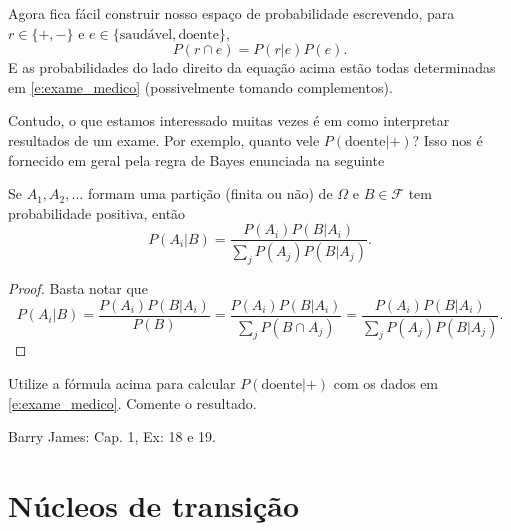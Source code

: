 Agora fica fácil construir nosso espaço de probabilidade escrevendo, para $r \in \{+, -\}$ e $e \in \{\text{saudável}, \text{doente}\}$,
\begin{equation}
  P(r \cap e) = P(r | e) P(e).
\end{equation}
E as probabilidades do lado direito da equação acima estão todas determinadas em \eqref{e:exame_medico} (possivelmente tomando complementos).

Contudo, o que estamos interessado muitas vezes é em como interpretar resultados de um exame.
Por exemplo, quanto vele $P(\text{doente} | +)$?
Isso nos é fornecido em geral pela regra de Bayes enunciada na seguinte

\begin{proposition}
  Se $A_1, A_2, \dots$ formam uma partição (finita ou não) de $\Omega$ e $B \in \mathcal{F}$ tem probabilidade positiva, então
  \begin{equation}
    P(A_i | B) = \frac{P(A_i) P(B | A_i)}{\sum_j P(A_j) P(B | A_j)}.
  \end{equation}
\end{proposition}

\begin{proof}
  Basta notar que
  \begin{equation}
    P(A_i | B) = \frac{P(A_i) P(B | A_i)}{P(B)} = \frac{P(A_i) P(B | A_i)}{\sum_j P(B \cap A_j)} = \frac{P(A_i) P(B | A_i)}{\sum_j P(A_j) P(B | A_j)}.
  \end{equation}
\end{proof}

\begin{exercise}
  Utilize a fórmula acima para calcular $P(\text{doente} | +)$ com os dados em \eqref{e:exame_medico}.
  Comente o resultado.
\end{exercise}

\begin{exercise}
  Barry James: Cap. 1, Ex: 18 e 19.
\end{exercise}



\section{Núcleos de transição}

